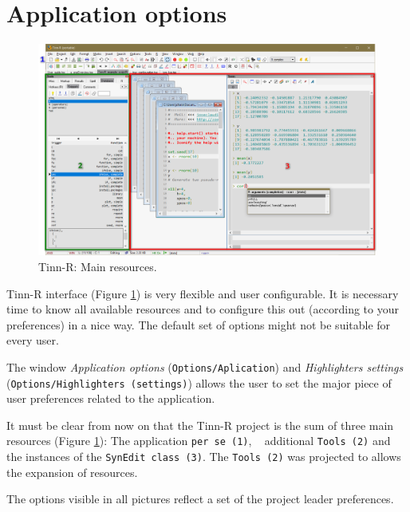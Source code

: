 
\hypertarget{working_app}{}
\section{Application options}

\begin{figure}[H]
  \begin{center}
    \includegraphics[width=\headwidth]{./res/parts_01.png}
  \end{center}
  \caption{Tinn-R: Main resources.}
  \label{fig:tinn-r_interface}
\end{figure}

Tinn-R interface
(Figure \ref{fig:tinn-r_interface})
is very flexible and user configurable. It is necessary time
to know all available resources and to configure this out (according to your
preferences) in a nice way. The default set of options might not be suitable
for every user.

The window \textit{Application options} (\texttt{Options/Aplication}) and
\textit{Highlighters settings} (\texttt{Options/Highlighters (settings)}) allows the user to set the major piece
of user preferences related to the application.

It must be clear from now on that the Tinn-R project is the sum of three main
resources (Figure \ref{fig:tinn-r_interface}):
The application \texttt{per se (1)}, ~
additional \texttt{Tools (2)} and
the instances of the \texttt{SynEdit class (3)}.
The \texttt{Tools (2)} was projected to allows the expansion of resources.

The options visible in all pictures reflect a set of the project leader preferences.


\hypertarget{working_app_main}{}
